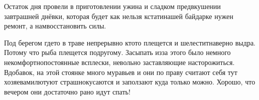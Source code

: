Остаток дня провели в приготовлении ужина и сладком предвкушении завтрашней днёвки, которая будет как нельзя кстати\mdash нашей байдарке нужен ремонт, а нам\mdash восстановить силы. 

Под берегом где\sdash то в траве непрерывно кто\sdash то плещется и шелестит\mdash наверно выдра. Потому что рыба плещется по\sdash другому. Засыпать из\sdash за этого было немного некомфортно\mdash постоянные всплески, невольно заставляющие насторожиться. Вдобавок, на этой стоянке много муравьев и они по праву считают себя тут хозяевами\mdash лютуют страшно\mdash кусаются и заползают куда только можно. Хорошо, что вечером они достаточно рано идут спать!

\begin{center}
\end{center}